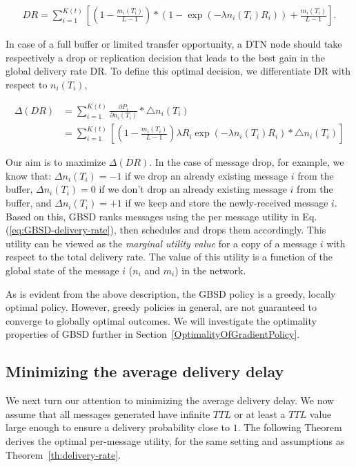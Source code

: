 \vspace{-0.4cm}
\small
\begin{align*} DR =\sum_{i=1}^{K(t)}\left[(1 - \frac{m_i(T_i)}{L-1})*(1 -\exp(-\lambda n_i(T_i)  R_i )) +\frac{m_i(T_i)}{L-1}\right].
\end{align*}
\normalsize

In case of a full buffer or limited transfer opportunity, a DTN node should take respectively a drop or replication decision that leads to the best gain in the global delivery rate DR. To define this optimal decision, we differentiate DR with respect to $n_i(T_i)$,

\small
\begin{align*}
\Delta(DR) &= \sum_{i=1}^{K(t)}{\frac{\partial P_i}{\partial n_i(T_i)} * \bigtriangleup n_i(T_i)}
\\&= \sum_{i=1}^{K(t)} \left[{(1-\frac{m_i(T_i)}{L-1})\lambda R_i\exp(-\lambda n_i(T_i) R_i) * \bigtriangleup n_i(T_i)}\right]
\end{align*}
\normalsize

Our aim is to maximize $\Delta(DR)$. In the case of message drop, for example, we know that: $\Delta n_i(T_i) = -1$ if we drop an already existing message $i$ from the buffer, $\Delta n_i(T_i) = 0$ if we don't drop an already existing message $i$ from the buffer, and $\Delta n_i(T_i) = +1$ if we keep and store the newly-received message $i$. Based on this, GBSD ranks messages using the per message utility in Eq.(\ref{eq:GBSD-delivery-rate}), then schedules and drops them accordingly. This utility can be viewed as the \emph{marginal utility value} for a copy of a message $i$ with respect to the total delivery rate. The value of this utility is a function of the global state of the message $i$ ($n_i$ and $m_i$) in the network.

As is evident from the above description, the GBSD policy is a greedy, locally optimal policy. However, greedy policies in general, are not guaranteed to converge to globally optimal outcomes. We will investigate the optimality properties of GBSD further in Section~\ref{OptimalityOfGradientPolicy}.

\subsection{Minimizing the average delivery delay}
\label{subsec:MinAvgDeliveryDelay}

We next turn our attention to minimizing the average delivery delay. We now assume that all messages generated have infinite $TTL$ or at least a $TTL$ value large enough to ensure a delivery probability close to $1$. The following Theorem derives the optimal per-message utility, for the same setting and assumptions as Theorem~\ref{th:delivery-rate}.

